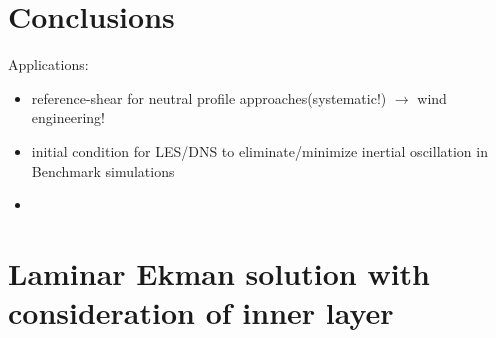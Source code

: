 \documentclass[a4paper,11pt]{amsart}
\begin{document}
\section{Conclusions}
%
Applications:
\begin{itemize}
\item reference-shear for neutral profile approaches(systematic!) $\rightarrow$ wind engineering! 
\item initial condition for LES/DNS to eliminate/minimize inertial oscillation in Benchmark simulations
\item
\end{itemize} 

\appendix

\section{Laminar Ekman solution with consideration of inner layer}
\label{app:ekman_solution}
\end{document}
